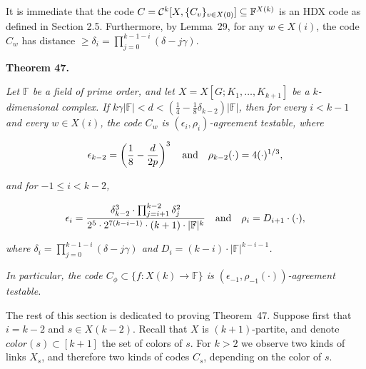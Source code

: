 It is immediate that the code $C={\cal C}^{k}[X,\{C_{v}\}_{v\in X(0)}]\subseteq\mathbb{F}^{X(k)}$ is an HDX code as defined in Section 2.5. Furthermore, by Lemma 29, for any $w\in X(i)$, the code $C_{w}$ has distance $\geq\delta_{i}=\prod_{j=0}^{k-1-i}(\delta-j\gamma)$.\par





\par\medskip\noindent\textbf{
\textbf{Theorem 47}\textbf{.}
}\par



\emph{Let $\mathbb{F}$ be a field of prime order, and let $X=X[G;K_{1},\dots,K_{k+1}]$ be a $k$-dimensional complex. If $k\gamma|\mathbb{F}|<d<\left(\frac{1}{4}-\frac{1}{8}\delta_{k-2}\right)|\mathbb{F}|$,  then for every $i<k-1$ and every $w\in X(i)$, the code $C_{w}$ is $(\epsilon_{i},\rho_{i})$-agreement testable, where}\par


\[\begin{gathered}
\epsilon_{k-2}=\left(\frac{1}{8}-\frac{d}{2p}\right)^{3}\nobreak\ \nobreak\ \nobreak\ \text{and}\nobreak\ \nobreak\ \nobreak\ \rho_{k-2}(\cdot)=4(\cdot)^{1/3},
\end{gathered}\]


\emph{and for $-1\leq i<k-2$,}\par


\[\begin{gathered}
\epsilon_{i}=\frac{\delta_{k-2}^{3}\cdot\prod_{j=i+1}^{k-2}\delta_{j}^{2}}{2^{5}\cdot 2^{7(k-i-1)}\cdot(k+1)\cdot|\mathbb{F}|^{k}}\nobreak\ \nobreak\ \nobreak\ \text{and}\nobreak\ \nobreak\ \nobreak\ \rho_{i}=D_{i+1}\cdot(\cdot),
\end{gathered}\]


\emph{where $\delta_{i}=\prod_{j=0}^{k-1-i}(\delta-j\gamma)$ and $D_{i}=(k-i)\cdot|\mathbb{F}|^{k-i-1}$.}\par




\emph{In particular, the code $C_{\phi}\subset\{f:X(k)\to\mathbb{F}\}$ is $(\epsilon_{-1},\rho_{-1}(\cdot))$-agreement testable.}\par






The rest of this section is dedicated to proving Theorem 47. Suppose first that $i=k-2$ and $s\in X(k-2)$. Recall that $X$ is $(k+1)$-partite, and denote $color(s)\subset[k+1]$ the set of colors of $s$. For $k>2$ we observe two kinds of links $X_{s}$, and therefore two kinds of codes $C_{s}$, depending on the color of $s$.\par



